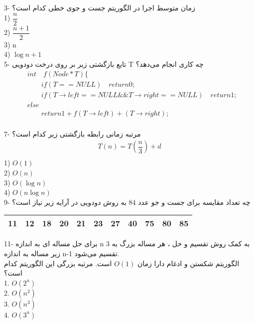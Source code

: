 \documentclass{book}
\begin{document}
3- زمان متوسط اجرا در الگوریتم جست و جوی خطی کدام است؟\\
1) $\dfrac{n}{2}$ \\
2) $\dfrac{n+1}{2}$ \\
3) n \\
4) $\log n+1$ \\

5- تابع بازگشتی زیر بر روی درخت دودویی T چه کاری انجام می‌دهد؟\\
\begin{align*}
&int \quad f(Node*T)\{\\
&\qquad if(T==NULL)\quad return 0;\\
&\qquad if(T\to left ==NULL \&\& T \to right == NULL) \quad return 1;\\
&else\\
&\qquad return 1+f(T\to left)+(T\to right);\\
\end{align*}

7- مرتبه زمانی رابطه بازگشتی زیر کدام است؟\\
\begin{align*}
T(n)=T(\dfrac{n}{3})+d\\
\end{align*}
1) $O(1)$ \\
2) $O(n)$\\
3) $O(\log n)$\\
4) $O(n\log n)$ \\

9- چه تعداد مقایسه برای جست و جو عدد 84 به روش دودویی در آرایه زیر نیاز است؟\\

\begin{table}[htp]
\renewcommand{\arraystretch}{1.5}
\begin{tabular}{|c|c|c|c|c|c|c|c|c|c|c|}
\hline
11& 12 & 18 & 20 & 21 & 23 & 27 &40 &75 &80 &85 \\ 
\hline
\end{tabular}
\end{table}

11- برای حل مساله ای به اندازه n به کمک روش تقسیم و حل ، هر مساله بزرگ به 3 زیر مساله به اندازه n-1 تقسیم می‌شود.\\
الگوریتم شکستن و ادغام دارا زمان $O(1)$ است. مرتبه بزرگی این الگوریتم کدام است؟\\
1.  $O(2^n)$\\
2. $O(n^2)$ \\
3. $O(n^3)$ \\
4. $O(3^n)$ \\
\end{document}
